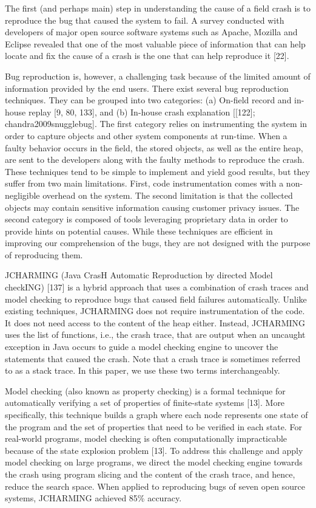 \documentclass[12pt]{report}
\begin{document}
The first (and perhaps main) step in understanding the cause of a field
crash is to reproduce the bug that caused the system to fail. A survey
conducted with developers of major open source software systems such as
Apache, Mozilla and Eclipse revealed that one of the most valuable piece
of information that can help locate and fix the cause of a crash is the
one that can help reproduce it {[}22{]}.

Bug reproduction is, however, a challenging task because of the limited
amount of information provided by the end users. There exist several bug
reproduction techniques. They can be grouped into two categories: (a)
On-field record and in-house replay {[}9, 80, 133{]}, and (b) In-house
crash explanation {[}{[}122{]}; chandra2009snugglebug{]}. The first
category relies on instrumenting the system in order to capture objects
and other system components at run-time. When a faulty behavior occurs
in the field, the stored objects, as well as the entire heap, are sent
to the developers along with the faulty methods to reproduce the crash.
These techniques tend to be simple to implement and yield good results,
but they suffer from two main limitations. First, code instrumentation
comes with a non-negligible overhead on the system. The second
limitation is that the collected objects may contain sensitive
information causing customer privacy issues. The second category is
composed of tools leveraging proprietary data in order to provide hints
on potential causes. While these techniques are efficient in improving
our comprehension of the bugs, they are not designed with the purpose of
reproducing them.

JCHARMING (Java CrasH Automatic Reproduction by directed Model checkING)
{[}137{]} is a hybrid approach that uses a combination of crash traces
and model checking to reproduce bugs that caused field failures
automatically. Unlike existing techniques, JCHARMING does not require
instrumentation of the code. It does not need access to the content of
the heap either. Instead, JCHARMING uses the list of functions, i.e.,
the crash trace, that are output when an uncaught exception in Java
occurs to guide a model checking engine to uncover the statements that
caused the crash. Note that a crash trace is sometimes referred to as a
stack trace. In this paper, we use these two terms interchangeably.

Model checking (also known as property checking) is a formal technique
for automatically verifying a set of properties of finite-state systems
{[}13{]}. More specifically, this technique builds a graph where each
node represents one state of the program and the set of properties that
need to be verified in each state. For real-world programs, model
checking is often computationally impracticable because of the state
explosion problem {[}13{]}. To address this challenge and apply model
checking on large programs, we direct the model checking engine towards
the crash using program slicing and the content of the crash trace, and
hence, reduce the search space. When applied to reproducing bugs of
seven open source systems, JCHARMING achieved 85\% accuracy.
\end{document}
